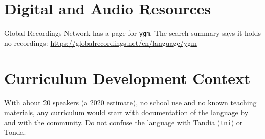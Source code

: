 \documentclass[12pt]{article}
\begin{document}
\section{Digital and Audio Resources}
Global Recordings Network has a page for \texttt{ygm}. The search summary says it holds no recordings: \url{https://globalrecordings.net/en/language/ygm}

\section{Curriculum Development Context}
With about 20 speakers (a 2020 estimate), no school use and no known teaching materials, any curriculum would start with documentation of the language by and with the community. Do not confuse the language with Tandia (\texttt{tni}) or Tonda.
\end{document}
